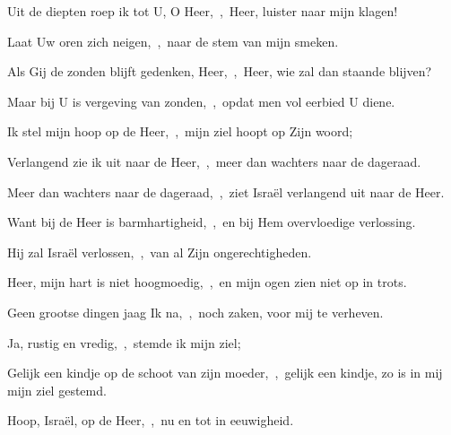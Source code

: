 \documentclass[12pt,twoside,a5paper]{article}
\begin{document}
\begin{halfparskip}
  Uit de diepten roep ik tot U, O Heer,~\sep\ Heer, luister naar mijn klagen!


  Laat Uw oren zich neigen,~\sep\ naar de stem van mijn smeken.

  Als Gij de zonden blijft gedenken, Heer,~\sep\ Heer, wie zal dan staande blijven?

  Maar bij U is vergeving van zonden,~\sep\ opdat men vol eerbied U diene.

  Ik stel mijn hoop op de Heer,~\sep\ mijn ziel hoopt op Zijn woord;

  Verlangend zie ik uit naar de Heer,~\sep\ meer dan wachters naar de dageraad.

  Meer dan wachters naar de dageraad,~\sep\ ziet Israël verlangend uit naar de Heer.

  Want bij de Heer is barmhartigheid,~\sep\ en bij Hem overvloedige verlossing.

  Hij zal Israël verlossen,~\sep\ van al Zijn ongerechtigheden.
\end{halfparskip}


\begin{halfparskip}
  Heer, mijn hart is niet hoogmoedig,~\sep\ en mijn ogen zien niet op in trots.


  Geen grootse dingen jaag Ik na,~\sep\ noch zaken, voor mij te verheven.

  Ja, rustig en vredig,~\sep\ stemde ik mijn ziel;

  Gelijk een kindje op de schoot van zijn moeder,~\sep\ gelijk een kindje, zo is in mij mijn ziel gestemd.

  Hoop, Israël, op de Heer,~\sep\ nu en tot in eeuwigheid.
\end{halfparskip}



\end{document}
